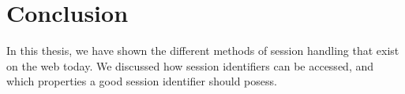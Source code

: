 \chapter{Conclusion}%

In this thesis, we have shown the different methods of session handling that exist on the web today. We discussed how session identifiers can be accessed, and which properties a good session identifier should posess.

